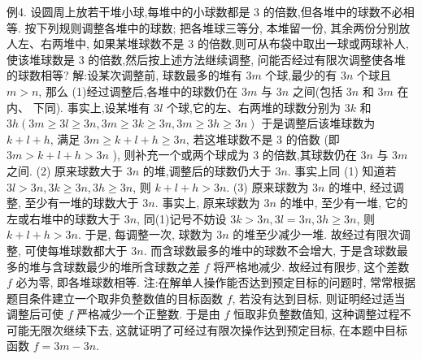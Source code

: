 例4. 设圆周上放若干堆小球,每堆中的小球数都是 3 的倍数,但各堆中的球数不必相等.
按下列规则调整各堆中的球数; 把各堆球三等分, 本堆留一份, 其余两份分别放人左、右两堆中, 如果某堆球数不是 3 的倍数,则可从布袋中取出一球或两球补人, 使该堆球数是 3 的倍数,然后按上述方法继续调整, 问能否经过有限次调整使各堆的球数相等?
解:设某次调整前, 球数最多的堆有 $3 m$ 个球,最少的有 $3 n$ 个球且 $m> n$, 那么
(1)经过调整后,各堆中的球数仍在 $3 m$ 与 $3 n$ 之间(包括 $3 n$ 和 $3 m$ 在内、 下同).
事实上,设某堆有 $3 l$ 个球,它的左、右两堆的球数分别为 $3 k$ 和 $3 h(3 m \geqslant 3 l \geqslant 3 n, 3 m \geqslant 3 k \geqslant 3 n, 3 m \geqslant 3 h \geqslant 3 n)$ 于是调整后该堆球数为 $k+l+h$, 满足 $3 m \geqslant k+l+h \geqslant 3 n$, 若这堆球数不是 3 的倍数 (即 $3 m>k+l+h>3 n$ ), 则补充一个或两个球成为 3 的倍数,其球数仍在 $3 n$ 与 $3 m$ 之间.
(2) 原来球数大于 $3 n$ 的堆,调整后的球数仍大于 $3 n$.
事实上同 (1) 知道若 $3 l>3 n, 3 k \geqslant 3 n, 3 h \geqslant 3 n$, 则 $k+l+h>3 n$.
(3) 原来球数为 $3 n$ 的堆中, 经过调整, 至少有一堆的球数大于 $3 n$.
事实上, 原来球数为 $3 n$ 的堆中, 至少有一堆, 它的左或右堆中的球数大于 $3 n$, 同(1)记号不妨设 $3 k>3 n, 3 l=3 n, 3 h \geqslant 3 n$, 则 $k+l+h>3 n$.
于是, 每调整一次, 球数为 $3 n$ 的堆至少减少一堆.
故经过有限次调整, 可使每堆球数都大于 $3 n$. 而含球数最多的堆中的球数不会增大, 于是含球数最多的堆与含球数最少的堆所含球数之差 $f$ 将严格地减少.
故经过有限步, 这个差数 $f$ 必为零, 即各堆球数相等.
注:在解单人操作能否达到预定目标的问题时, 常常根据题目条件建立一个取非负整数值的目标函数 $f$, 若没有达到目标, 则证明经过适当调整后可使 $f$ 严格减少一个正整数.
于是由 $f$ 恒取非负整数值知, 这种调整过程不可能无限次继续下去, 这就证明了可经过有限次操作达到预定目标, 在本题中目标函数 $f=3 m-3 n$.



